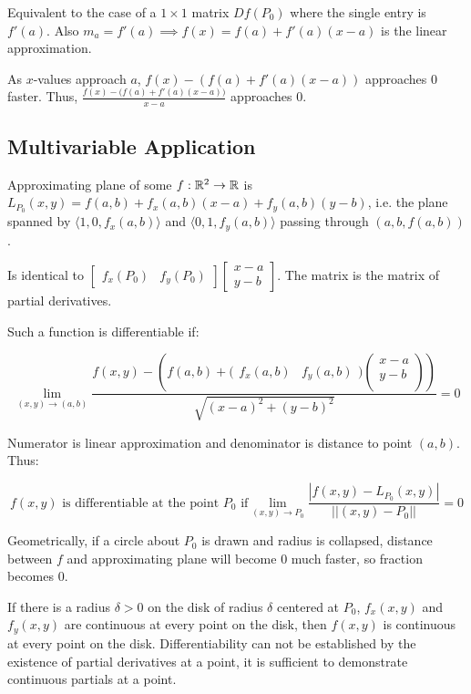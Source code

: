 Equivalent to the case of a $1\times 1$ matrix $Df(P_0)$ where the single entry is $f'(a)$.
Also $m_a=f'(a)\implies f(x)=f(a)+f'(a)(x-a)$ is the linear approximation. 

As $x$-values approach $a$, $f(x)-(f(a)+f'(a)(x-a))$ approaches 0 faster. Thus, $\frac{f(x)-\big(f(a)+f'(a)(x-a)\big)}{x-a}$ approaches 0.

\subsection{Multivariable Application}

Approximating plane of some $f:\mathbb{R}^2\to \mathbb{R}$ is $L_{P_0}(x,y)=f(a,b)+f_x(a,b)(x-a)+f_y(a,b)(y-b)$, i.e. the plane spanned by
$\langle 1,0,f_x(a,b)\rangle$ and $\langle 0,1,f_y(a,b)\rangle$ passing through $(a,b,f(a,b))$.

Is identical to $\begin{bmatrix}f_x(P_0)&f_y(P_0)\end{bmatrix}\begin{bmatrix}x-a\\y-b\end{bmatrix}$. The matrix is the matrix of partial derivatives.

Such a function is differentiable if:

\[\displaystyle \lim_{(x,y)\to(a,b)}\frac{f(x,y)-\left(f(a,b)+\Big(\begin{matrix} f_x(a,b)&f_y(a,b) \end{matrix} \Big)\left(\begin{matrix}x-a\\y-b\\ \end{matrix} \right) \right)}{\sqrt{(x-a)^2+(y-b)^2}}=0\]

Numerator is linear approximation and denominator is distance to point $(a,b)$. Thus:

\[\boxed{f(x,y) \mbox{ is differentiable at the point }P_0\mbox{ if}\displaystyle \lim_{(x,y)\to P_0}\frac{|f(x,y)-L_{P_0}(x,y)|}{||(x,y)-P_0||}=0}\]

Geometrically, if a circle about $P_0$ is drawn and radius is collapsed, distance between $f$ and approximating plane will become 0 much faster, so fraction becomes 0.

If there is a radius $\delta > 0$ on the disk of radius $\delta$ centered at $P_0$, $f_x(x,y)$ and $f_y(x,y)$ are continuous at every point on the disk, then $f(x,y)$ is continuous at every point on the disk.
Differentiability can not be established by the existence of partial derivatives at a point, it is sufficient to demonstrate continuous partials
at a point.

